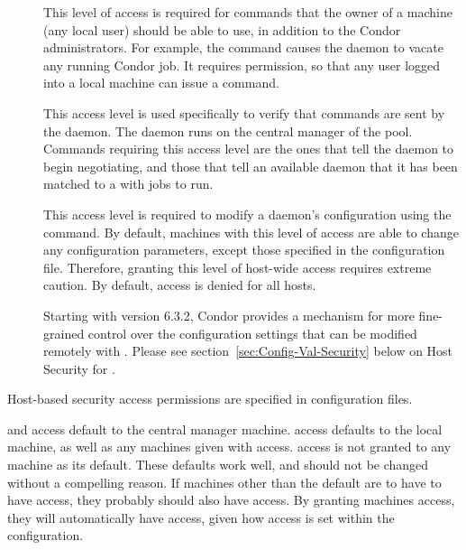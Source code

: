 \begin{description}
\item[] \label{dcperm:owner} This level of access is
   required for commands that the owner of a machine (any local user)
   should be able to use, in addition to the Condor administrators.
   For example, the  command causes the
    daemon to vacate any running Condor job.
   It requires  permission,
   so that any user logged into a local machine
   can issue a  command.

\item[] \label{dcperm:negotiator} This 
   access level is used specifically to verify that commands are
   sent by the  daemon.
   The  daemon runs on the central manager of
   the pool.
   Commands requiring this access
   level are the ones that tell the  daemon to begin
   negotiating, and those that tell an available  daemon
   that it has been matched to a  with jobs to run.

\item[] \label{dcperm:config} This access level is
   required to modify a daemon's configuration using
   the  command.
   By default, machines with this level of access are able 
   to change any configuration parameters, except those specified in
   the  configuration file.
   Therefore, granting this level of host-wide access requires
   extreme caution.
   By default,  access is denied for all hosts.

   Starting with version 6.3.2, Condor provides a mechanism for more
   fine-grained control over the configuration settings that can be
   modified remotely with .  
   Please see section~\ref{sec:Config-Val-Security} below on Host
   Security for .

\end{description}

Host-based security access
permissions are specified in configuration files.

 and  access default to 
the central manager machine.
 access defaults to the local machine, as well as
any machines
given with  access.
 access is not granted to any machine
as its default.
These defaults work well, and should not be changed without
a compelling reason.
If machines other than the default are to have to have 
access, they probably should also have  access.
By granting machines  access, they
will automatically have  access, given how
 access is set within the configuration.

